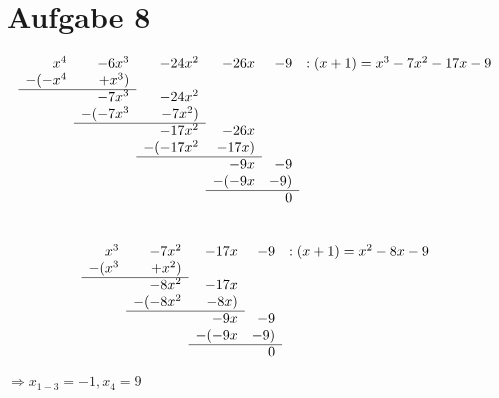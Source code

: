 \documentclass[ngerman, a4paper]{scrartcl}
\begin{document}
	\section*{Aufgabe 8}
	\begin{equation*}
		\begin{array}{rrrrrl}
			x^4&-6x^3&-24x^2&-26x&-9&:(x+1)=x^3-7x^2-17x-9\\
			-(-x^4&+x^3)&&&&\\
			\cline{1-2}
			&-7x^3&-24x^2&&&\\
			&-(-7x^3&-7x^2)&&&\\	
			\cline{2-3}
			&&-17x^2&-26x&&\\
			&&-(-17x^2&-17x)&&\\
			\cline{3-4}
			&&&-9x&-9&\\
			&&&-(-9x&-9)&\\
			\cline{4-5}
			&&&&0&		
		\end{array}
	\end{equation*}
	\\
	
	\begin{equation*}
		\begin{array}{rrrrl}
			x^3&-7x^2&-17x&-9&:(x+1)=x^2-8x-9\\
			-(x^3&+x^2)&&&\\
			\cline{1-2}
			&-8x^2&-17x&&\\
			&-(-8x^2&-8x)&&\\	
			\cline{2-3}
			&&-9x&-9&\\
			&&-(-9x&-9)&\\
			\cline{3-4}
			&&&0&		
		\end{array}
	\end{equation*}
	
	$\Rightarrow x_{1-3}=-1, x_4=9$
	
\end{document}
